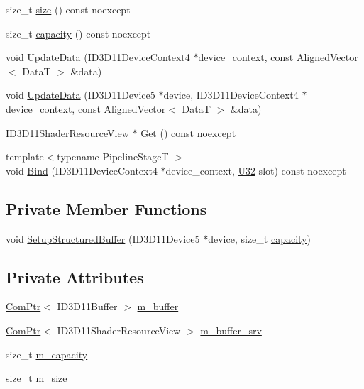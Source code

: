 \begin{DoxyCompactItemize}
size\+\_\+t \hyperlink{classmage_1_1_structured_buffer_a1e9ccab07c0f78ff1a8e4d8a0590f79e}{size} () const noexcept
\item 
size\+\_\+t \hyperlink{classmage_1_1_structured_buffer_a4fe2940f733bccb2cd47227a44a93c2b}{capacity} () const noexcept
\item 
void \hyperlink{classmage_1_1_structured_buffer_a90b8b69fa181a962feef72d957a04f16}{Update\+Data} (I\+D3\+D11\+Device\+Context4 $\ast$device\+\_\+context, const \hyperlink{namespacemage_a8664bfb5ce2179fc64eae9f82c8a5ba8}{Aligned\+Vector}$<$ DataT $>$ \&data)
\item 
void \hyperlink{classmage_1_1_structured_buffer_a42b69e5e86981fd672e40042c5946043}{Update\+Data} (I\+D3\+D11\+Device5 $\ast$device, I\+D3\+D11\+Device\+Context4 $\ast$device\+\_\+context, const \hyperlink{namespacemage_a8664bfb5ce2179fc64eae9f82c8a5ba8}{Aligned\+Vector}$<$ DataT $>$ \&data)
\item 
I\+D3\+D11\+Shader\+Resource\+View $\ast$ \hyperlink{classmage_1_1_structured_buffer_ad933738bc55b10aea665913a8215bab0}{Get} () const noexcept
\item 
{\footnotesize template$<$typename Pipeline\+StageT $>$ }\\void \hyperlink{classmage_1_1_structured_buffer_ae3884b12cbf30188089481b39fefa4c2}{Bind} (I\+D3\+D11\+Device\+Context4 $\ast$device\+\_\+context, \hyperlink{namespacemage_a41c104c036fba3756a74e19f793eeaa1}{U32} slot) const noexcept
\end{DoxyCompactItemize}
\subsection*{Private Member Functions}
\begin{DoxyCompactItemize}
\item 
void \hyperlink{classmage_1_1_structured_buffer_a3a49637c7edac6bdca00cb4e8fe59887}{Setup\+Structured\+Buffer} (I\+D3\+D11\+Device5 $\ast$device, size\+\_\+t \hyperlink{classmage_1_1_structured_buffer_a4fe2940f733bccb2cd47227a44a93c2b}{capacity})
\end{DoxyCompactItemize}
\subsection*{Private Attributes}
\begin{DoxyCompactItemize}
\item 
\hyperlink{namespacemage_ae74f374780900893caa5555d1031fd79}{Com\+Ptr}$<$ I\+D3\+D11\+Buffer $>$ \hyperlink{classmage_1_1_structured_buffer_adbd113ab2fe539e34587887876fe3825}{m\+\_\+buffer}
\item 
\hyperlink{namespacemage_ae74f374780900893caa5555d1031fd79}{Com\+Ptr}$<$ I\+D3\+D11\+Shader\+Resource\+View $>$ \hyperlink{classmage_1_1_structured_buffer_a94f811f1d36cf63dad600e6f89dcc40b}{m\+\_\+buffer\+\_\+srv}
\item 
size\+\_\+t \hyperlink{classmage_1_1_structured_buffer_a539f6e6d27380db47acd69ba8917d4c0}{m\+\_\+capacity}
\item 
size\+\_\+t \hyperlink{classmage_1_1_structured_buffer_afcf4b378401dc1060f133ea7249edf19}{m\+\_\+size}
\end{DoxyCompactItemize}


